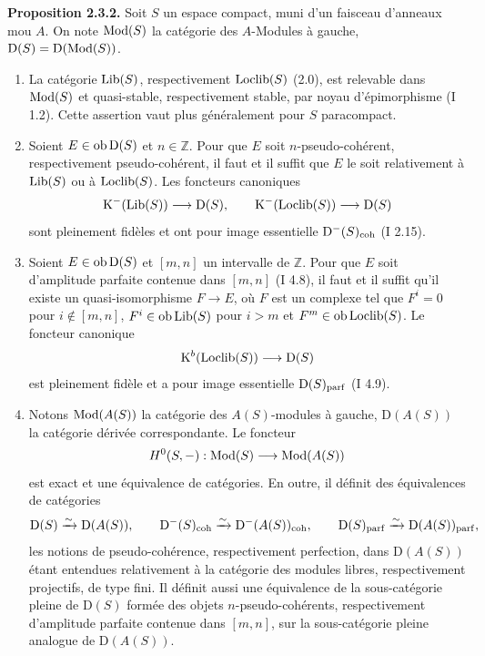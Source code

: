 \documentclass[11pt]{article}
\begin{document}
\textbf{Proposition 2.3.2.} Soit $S$ un espace compact, muni d'un faisceau d'anneaux mou $A$. On note $\operatorname{Mod}(S)$ la catégorie des $A$-Modules à gauche, $\mathrm D(S)=\mathrm D(\operatorname{Mod}(S))$.
\begin{enumerate}[label=\alph*)]
\item La catégorie $\operatorname{Lib}(S)$, respectivement $\operatorname{Loclib}(S)$ (2.0), est relevable dans $\operatorname{Mod}(S)$ et quasi-stable, respectivement stable, par noyau d'épimorphisme (I 1.2). Cette assertion vaut plus généralement pour $S$ paracompact.
\item Soient $E\in\operatorname{ob}\mathrm D(S)$ et $n\in\mathbb Z$. Pour que $E$ soit $n$-pseudo-cohérent, respectivement pseudo-cohérent, il faut et il suffit que $E$ le soit relativement à $\operatorname{Lib}(S)$ ou à $\operatorname{Loclib}(S)$. Les foncteurs canoniques
\[
\mathrm K^{-}(\operatorname{Lib}(S))\longrightarrow \mathrm D(S),
\qquad
\mathrm K^{-}(\operatorname{Loclib}(S))\longrightarrow \mathrm D(S)
\]
sont pleinement fidèles et ont pour image essentielle $\mathrm D^{-}(S)_{\operatorname{coh}}$ (I 2.15).
\item Soient $E\in\operatorname{ob}\mathrm D(S)$ et $[m,n]$ un intervalle de $\mathbb Z$. Pour que $E$ soit d'amplitude parfaite contenue dans $[m,n]$ (I 4.8), il faut et il suffit qu'il existe un quasi-isomorphisme $F\to E$, où $F$ est un complexe tel que $F^i=0$ pour $i\notin[m,n]$, $F^i\in\operatorname{ob}\operatorname{Lib}(S)$ pour $i>m$ et $F^m\in\operatorname{ob}\operatorname{Loclib}(S)$. Le foncteur canonique
\[
\mathrm K^b(\operatorname{Loclib}(S))\longrightarrow\mathrm D(S)
\]
est pleinement fidèle et a pour image essentielle $\mathrm D(S)_{\operatorname{parf}}$ (I 4.9).
\item Notons $\operatorname{Mod}(A(S))$ la catégorie des $A(S)$-modules à gauche, $\mathrm D(A(S))$ la catégorie dérivée correspondante. Le foncteur
\[
H^0(S,-):\operatorname{Mod}(S)\longrightarrow\operatorname{Mod}(A(S))
\]
est exact et une équivalence de catégories. En outre, il définit des équivalences de catégories
\[
\mathrm D(S)\xrightarrow{\sim}\mathrm D(A(S)),\qquad
\mathrm D^{-}(S)_{\operatorname{coh}}\xrightarrow{\sim}\mathrm D^{-}(A(S))_{\operatorname{coh}},\qquad
\mathrm D(S)_{\operatorname{parf}}\xrightarrow{\sim}\mathrm D(A(S))_{\operatorname{parf}},
\]
les notions de pseudo-cohérence, respectivement perfection, dans $\mathrm D(A(S))$ étant entendues relativement à la catégorie des modules libres, respectivement projectifs, de type fini. Il définit aussi une équivalence de la sous-catégorie pleine de $\mathrm D(S)$ formée des objets $n$-pseudo-cohérents, respectivement d'amplitude parfaite contenue dans $[m,n]$, sur la sous-catégorie pleine analogue de $\mathrm D(A(S))$.
\end{enumerate}
\end{document}
